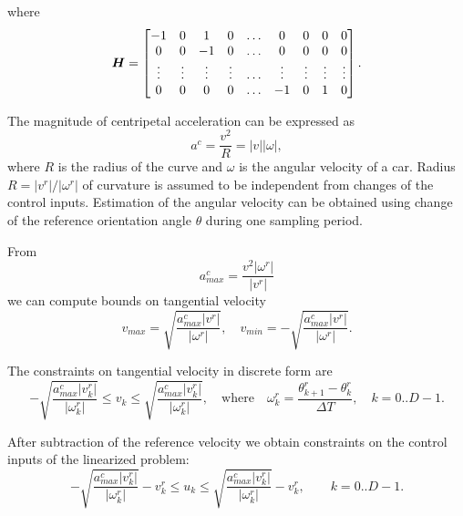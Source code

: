 \documentclass[12pt,a4paper]{article}
\newcommand{\mbm}[1]{\mbox{\boldmath $#1$}}
\newcommand{\normv}[1]{\lvert#1\rvert}
\begin{document}
where 
\begin{equation}
\mbm{H} = 
\begin{bmatrix}
    -1      & 0      & 1      & 0      & \dots  & 0      & 0      & 0      & 0 \\
    0       & 0      & -1     & 0      & \dots  & 0      & 0      & 0      & 0 \\
    \vdots  & \vdots & \vdots & \vdots & \dots  & \vdots & \vdots & \vdots & \vdots \\
    0       & 0      & 0      & 0      & \dots  & -1     & 0      & 1      & 0 \\
\end{bmatrix}.
\end{equation}

The magnitude of centripetal acceleration can be expressed as 
\begin{equation}\label{eq.ca}
a^c = \frac{v^2}{R} = \normv{v} \normv{\omega},
\end{equation}
where $R$ is the radius of the curve and $\omega$ is the angular velocity of a car. Radius 
$R = \normv{v^r}/\normv{\omega^r}$ of curvature is assumed to be independent from changes 
of the control inputs. Estimation of the angular velocity can be obtained using change of 
the reference orientation angle $\theta$ during one sampling period. 

From 
\begin{equation}
a^c_{max} = \frac{v^2 \normv{\omega^r}}{\normv{v^r}}
\end{equation}
we can compute bounds on tangential velocity
\begin{equation}
v_{max} = \sqrt{\frac{a^c_{max} \normv{v^r}}{\normv{\omega^r}}},
\quad
v_{min} = -\sqrt{\frac{a^c_{max} \normv{v^r}}{\normv{\omega^r}}}.
\end{equation}

The constraints on tangential velocity in discrete form are
\begin{equation}
-\sqrt{\frac{a^c_{max} \normv{v^r_k}}{\normv{\omega^r_k}}}
\le
v_k
\le
\sqrt{\frac{a^c_{max} \normv{v^r_k}}{\normv{\omega^r_k}}},
\quad
\mbox{where}
\quad
\omega^r_k = \frac{\theta_{k+1}^r - \theta_{k}^r}{\Delta T},
\quad k = 0..D-1.
\end{equation}

After subtraction of the reference velocity we obtain constraints on the
control inputs of the linearized problem:
\begin{equation}
-\sqrt{\frac{a^c_{max} \normv{v^r_k}}{\normv{\omega^r_k}}} - v^r_k
\le
u_k
\le
\sqrt{\frac{a^c_{max} \normv{v^r_k}}{\normv{\omega^r_k}}} - v^r_k,
\quad
\quad k = 0..D-1.
\end{equation}
\end{document}
